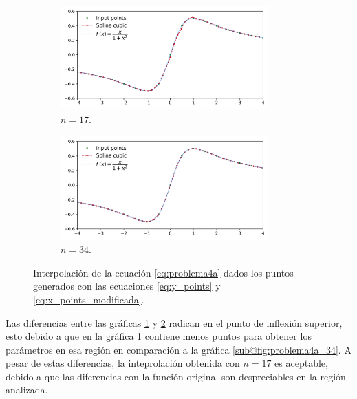 \begin{figure}[H]
	\centering
	\begin{subfigure}[b]{8cm}
		\includegraphics[width=8cm]{Graphics/problema04a_17.png}
		\caption{$n=17$.}
		\label{fig:problema4a_17}
	\end{subfigure}
	\begin{subfigure}[b]{8cm}
		\includegraphics[width=8cm]{Graphics/problema04a_34.png}
		\caption{$n=34$.}
		\label{fig:problema4a_34}
	\end{subfigure}
	\caption{Interpolación de la ecuación \ref{eq:problema4a} dados los puntos generados con las ecuaciones \ref{eq:y_points} y \ref{eq:x_points_modificada}.}
	\label{fig:problema4a}
\end{figure}

Las diferencias entre las gráficas \ref{fig:problema4a_17} y \ref{fig:problema4a_34} radican en el punto de inflexión superior, esto debido a que en la gráfica \ref{fig:problema4a_17} contiene menos puntos para obtener los parámetros en esa región en comparación a la gráfica \ref{sub@fig:problema4a_34}. A pesar de estas diferencias, la inteprolación obtenida con $n=17$ es aceptable, debido a que las diferencias con la función original son despreciables en la región analizada.